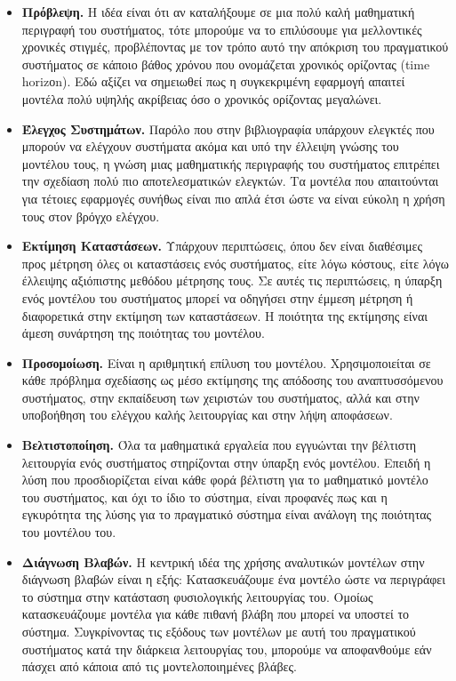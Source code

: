 \begin{itemize}
	\item
	{
		\textbf{Πρόβλεψη.} Η ιδέα είναι ότι αν καταλήξουμε σε μια πολύ καλή μαθηματική περιγραφή του συστήματος, τότε μπορούμε να το επιλύσουμε για μελλοντικές χρονικές στιγμές, προβλέποντας με τον τρόπο αυτό την απόκριση του πραγματικού συστήματος σε κάποιο βάθος χρόνου που ονομάζεται χρονικός ορίζοντας (time horizοn). Εδώ αξίζει να σημειωθεί πως η συγκεκριμένη εφαρμογή απαιτεί μοντέλα πολύ υψηλής ακρίβειας όσο ο χρονικός ορίζοντας μεγαλώνει.
		
	}
	
	\item 
	{
		\textbf{Έλεγχος Συστημάτων.} Παρόλο που στην βιβλιογραφία υπάρχουν ελεγκτές που μπορούν να ελέγχουν συστήματα ακόμα και υπό την έλλειψη γνώσης του μοντέλου τους, η γνώση μιας μαθηματικής περιγραφής του συστήματος επιτρέπει την σχεδίαση πολύ πιο αποτελεσματικών ελεγκτών. Τα μοντέλα που απαιτούνται για τέτοιες εφαρμογές συνήθως είναι πιο απλά έτσι ώστε να είναι εύκολη η χρήση τους στον βρόγχο ελέγχου.
	}
	
	\item 
	{
		\textbf{Εκτίμηση Καταστάσεων.} Υπάρχουν περιπτώσεις, όπου δεν είναι διαθέσιμες προς μέτρηση όλες οι καταστάσεις ενός συστήματος, είτε λόγω κόστους, είτε λόγω έλλειψης αξιόπιστης μεθόδου μέτρησης τους. Σε αυτές τις περιπτώσεις, η ύπαρξη ενός μοντέλου του συστήματος μπορεί να οδηγήσει στην έμμεση μέτρηση ή διαφορετικά στην εκτίμηση των καταστάσεων. Η ποιότητα της εκτίμησης είναι άμεση συνάρτηση της ποιότητας του μοντέλου.
	}
	
	\item 
	{
		\textbf{Προσομοίωση.} Είναι η αριθμητική επίλυση του μοντέλου. Χρησιμοποιείται σε κάθε πρόβλημα σχεδίασης ως μέσο εκτίμησης της απόδοσης του αναπτυσσόμενου συστήματος, στην εκπαίδευση των χειριστών του συστήματος, αλλά και στην υποβοήθηση του ελέγχου καλής λειτουργίας και στην λήψη αποφάσεων.  
	}
	
	\item 
	{
		\textbf{Βελτιστοποίηση.} Όλα τα μαθηματικά εργαλεία που εγγυώνται την βέλτιστη λειτουργία ενός συστήματος στηρίζονται στην ύπαρξη ενός μοντέλου. Επειδή η λύση που προσδιορίζεται είναι κάθε φορά βέλτιστη για το μαθηματικό μοντέλο του συστήματος, και όχι το ίδιο το σύστημα, είναι προφανές πως και η εγκυρότητα της λύσης για το πραγματικό σύστημα είναι ανάλογη της ποιότητας του μοντέλου του.
	}
	
	\item 
	{
		\textbf{Διάγνωση Βλαβών.} Η κεντρική ιδέα της χρήσης αναλυτικών μοντέλων στην διάγνωση βλαβών είναι η εξής: Κατασκευάζουμε ένα μοντέλο ώστε να περιγράφει το σύστημα στην κατάσταση φυσιολογικής λειτουργίας του. Ομοίως κατασκευάζουμε μοντέλα για κάθε πιθανή βλάβη που μπορεί να υποστεί το σύστημα. Συγκρίνοντας τις εξόδους των μοντέλων με αυτή του πραγματικού συστήματος κατά την διάρκεια λειτουργίας του, μπορούμε να αποφανθούμε εάν πάσχει από κάποια από τις μοντελοποιημένες βλάβες.
	}
	
\end{itemize}


